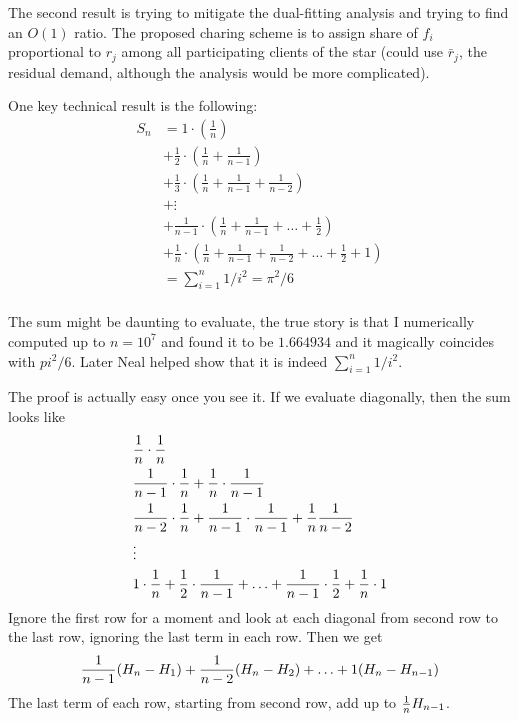 \documentclass{article}
\begin{document}
The second result is trying to mitigate the dual-fitting analysis and
trying to find an $O(1)$ ratio. The proposed charing scheme is to
assign share of $f_i$ proportional to $r_j$ among all participating
clients of the star (could use $\bar r_j$, the residual demand,
although the analysis would be more complicated).

One key technical result is the following:
\begin{align*}
  S_n &=
  1\cdot \left( \frac{1}{n} \right)\\
  &+ \frac{1}{2} \cdot \left( \frac{1}{n} + \frac{1}{n-1} \right)\\
  &+ \frac{1}{3} \cdot \left( \frac{1}{n} + \frac{1}{n-1} + \frac{1}{n-2} \right)\\
  &+ \vdots\\
  &+ \frac{1}{n-1} \cdot \left( \frac{1}{n} + \frac{1}{n-1} + \ldots + \frac{1}{2} \right)\\
  &+ \frac{1}{n} \cdot \left( \frac{1}{n} + \frac{1}{n-1} + \frac{1}{n-2} + \ldots + \frac{1}{2} + 1 \right)\\
  &= \sum_{i=1}^n 1/i^2 = \pi^2/6\\
\end{align*}

The sum might be daunting to evaluate, the true story is that I
numerically computed up to $n=10^7$ and found it to be $1.664934$ and
it magically coincides with $pi^2/6$. Later Neal helped show that it
is indeed $\sum_{i=1}^n 1/i^2$.

The proof is actually easy once you see it. If we evaluate diagonally,
then the sum looks like
\begin{align*}
  &{ \frac{1}{n} }\cdot { \frac{1}{n} }\\
  &{ \frac{1}{n-1} }\cdot{ \frac{1}{n} } + { \frac{1}{n} }\cdot{ \frac{1}{n-1} }\\
  &{ \frac{1}{n-2} }\cdot{ \frac{1}{n} } + { \frac{1}{n-1} }\cdot{ \frac{1}{n-1} } +
  { \frac{1}{n} }{ \frac{1}{n-2} }\\
  &\vdots\\
  &1\cdot{ \frac{1}{n} } + { \frac{1}{2} }\cdot{ \frac{1}{n-1} } + \ldots +
  { \frac{1}{n-1} }\cdot{ \frac{1}{2} } + { \frac{1}{n} }\cdot 1\\
\end{align*}
Ignore the first row for a moment and look at each diagonal from
second row to the last row, ignoring the last term in each row. Then
we get
\begin{equation}\label{eq:nth}
  { \frac{1}{n-1} } (H_n - H_1) + { \frac{1}{n-2} } (H_n - H_2) + \ldots + 1 (H_n - H_{n-1})
\end{equation}
The last term of each row, starting from second row, add up to
${ \frac{1}{n} } H_{n-1}$.
\end{document}
